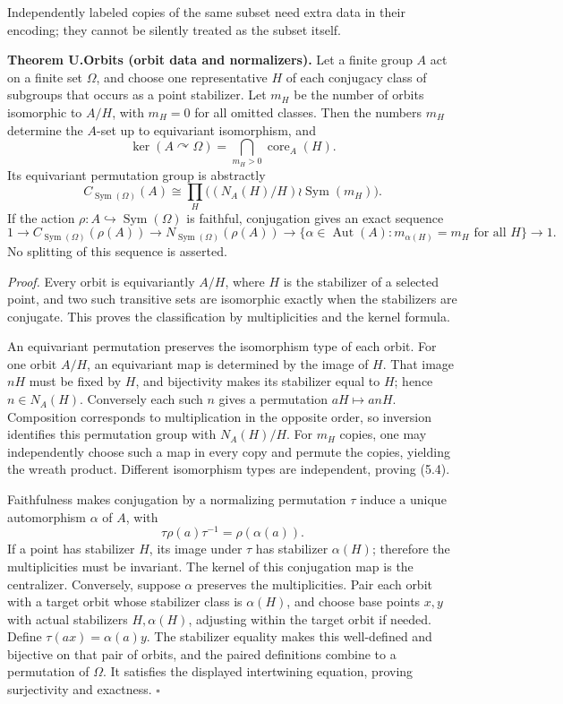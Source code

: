 \documentclass[
  11pt,
  a4paper,
]{article}
\begin{document}
Independently labeled copies of the same subset need extra data in their
encoding; they cannot be silently treated as the subset itself.

\textbf{Theorem U.Orbits (orbit data and normalizers).} Let a finite
group \(A\) act on a finite set \(\Omega\), and choose one
representative \(H\) of each conjugacy class of subgroups that occurs as
a point stabilizer. Let \(m_H\) be the number of orbits isomorphic to
\(A/H\), with \(m_H=0\) for all omitted classes. Then the numbers
\(m_H\) determine the \(A\)-set up to equivariant isomorphism, and \[
\ker(A\curvearrowright\Omega)=\bigcap_{m_H>0}\operatorname{core}_A(H).
\tag{5.3}
\] Its equivariant permutation group is abstractly \[
C_{\operatorname{Sym}(\Omega)}(A)\cong
\prod_H\bigl((N_A(H)/H)\wr\operatorname{Sym}(m_H)\bigr).
\tag{5.4}
\] If the action \(\rho:A\hookrightarrow\operatorname{Sym}(\Omega)\) is
faithful, conjugation gives an exact sequence \[
1\longrightarrow C_{\operatorname{Sym}(\Omega)}(\rho(A))
\longrightarrow N_{\operatorname{Sym}(\Omega)}(\rho(A))
\longrightarrow
\{\alpha\in\operatorname{Aut}(A):m_{\alpha(H)}=m_H\text{ for all }H\}
\longrightarrow1.
\tag{5.5}
\] No splitting of this sequence is asserted.

\emph{Proof.} Every orbit is equivariantly \(A/H\), where \(H\) is the
stabilizer of a selected point, and two such transitive sets are
isomorphic exactly when the stabilizers are conjugate. This proves the
classification by multiplicities and the kernel formula.

An equivariant permutation preserves the isomorphism type of each orbit.
For one orbit \(A/H\), an equivariant map is determined by the image of
\(H\). That image \(nH\) must be fixed by \(H\), and bijectivity makes
its stabilizer equal to \(H\); hence \(n\in N_A(H)\). Conversely each
such \(n\) gives a permutation \(aH\mapsto anH\). Composition
corresponds to multiplication in the opposite order, so inversion
identifies this permutation group with \(N_A(H)/H\). For \(m_H\) copies,
one may independently choose such a map in every copy and permute the
copies, yielding the wreath product. Different isomorphism types are
independent, proving (5.4).

Faithfulness makes conjugation by a normalizing permutation \(\tau\)
induce a unique automorphism \(\alpha\) of \(A\), with \[
\tau\rho(a)\tau^{-1}=\rho(\alpha(a)).
\] If a point has stabilizer \(H\), its image under \(\tau\) has
stabilizer \(\alpha(H)\); therefore the multiplicities must be
invariant. The kernel of this conjugation map is the centralizer.
Conversely, suppose \(\alpha\) preserves the multiplicities. Pair each
orbit with a target orbit whose stabilizer class is \(\alpha(H)\), and
choose base points \(x,y\) with actual stabilizers \(H,\alpha(H)\),
adjusting within the target orbit if needed. Define
\(\tau(ax)=\alpha(a)y\). The stabilizer equality makes this well-defined
and bijective on that pair of orbits, and the paired definitions combine
to a permutation of \(\Omega\). It satisfies the displayed intertwining
equation, proving surjectivity and exactness. \(\square\)
\end{document}
